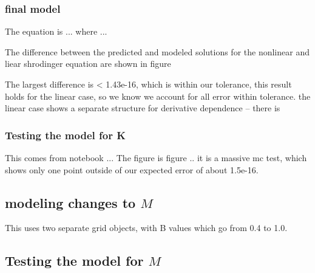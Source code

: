 \documentclass[A4,12pt,oneside]{article}
\renewcommand{\(}{\left(}
\renewcommand{\)}{\right)}
\begin{document}
\subsubsection{final model}
The equation is ...
where ...

The difference between the predicted and modeled solutions for the nonlinear and liear shrodinger equation are shown in figure 

The largest difference is  < 1.43e-16, which is within our tolerance, this result holds for the linear case, so we know we account for all error within tolerance. the linear case shows a separate structure for derivative dependence -- there is 

\subsubsection{Testing the model for K}

This comes from notebook ... The figure is figure ..
it is a massive mc test, which shows only one point outside of our expected error of about 1.5e-16. 

\subsection{modeling changes to $M$}
This uses two separate grid objects, with B values which go from 0.4 to 1.0. 

\subsection{Testing the model for $M$}
\end{document}
